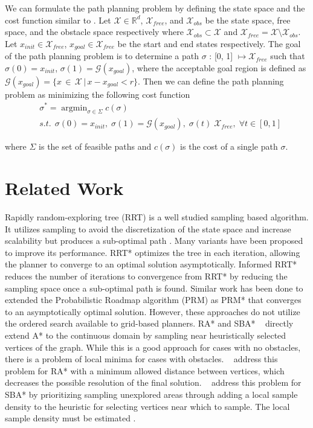 \documentclass{article}
\DeclareMathOperator*{\argmin}{argmin}
\begin{document}
We can formulate the path planning problem by defining the state space and the cost function similar to \cite{rrt*}. Let $\mathcal{X} \in \mathbb{R}^d$, $\mathcal{X}_{free}$, and $\mathcal{X}_{obs}$ be the state space, free space, and the obstacle space respectively where $\mathcal{X}_{obs} \subset \mathcal{X}$ and $\mathcal{X}_{free}  = \mathcal{X} \setminus \mathcal{X}_{obs}$. Let $x_{init} \in \mathcal{X}_{free}$, $x_{goal} \in \mathcal{X}_{free}$ be the start and end states respectively. The goal of the path planning problem is to determine a path $\sigma$ : [0, 1] $\mapsto \mathcal{X}_{free}$ such that $\sigma(0) = x_{init}$, $\sigma(1) = \mathcal{G}(x_{goal})$, where the acceptable goal region is defined as $\mathcal{G}(x_{goal}) = \{x \, \in \, \mathcal{X} \, | \, x - x_{goal} < r\}$. Then we can define the path planning problem as minimizing the following cost function
    \begin{align}
        & \sigma^* = \argmin_{\sigma \in \Sigma} c(\sigma) \\
        & s.t. \;\, \sigma(0) = x_{init}, \; \sigma(1) = \mathcal{G}(x_{goal}), \; \sigma(t) \;  \mathcal{X}_{free}, \; \forall t \in [0,1] \nonumber
    \end{align}
    
where $\Sigma$ is the set of feasible paths and $c(\sigma)$ is the cost of a single path $\sigma$.


\section{Related Work}
\label{sec:Related Work}
    Rapidly random-exploring tree (RRT) \cite{rrt} is a well studied sampling based algorithm. It utilizes sampling to avoid the discretization of the state space and increase scalability but produces a sub-optimal path \cite{rrt*}. Many variants have been proposed to improve its performance. RRT* \cite{rrt*} optimizes the tree in each iteration, allowing the planner to converge to an optimal solution asymptotically. Informed RRT* \cite{irrt} reduces the number of iterations to convergence from RRT* by reducing the sampling space once a sub-optimal path is found. Similar work has been done to extended the Probabilistic Roadmap algorithm (PRM) as PRM* \cite{rrt*} that converges to an asymptotically optimal solution. However, these approaches do not utilize the ordered search available to grid-based planners. RA* \citep{RA*} and SBA* ~\citep{SBA*} directly extend A* to the continuous domain by sampling near heuristically selected vertices of the graph. While this is a good approach for cases with no obstacles, there is a problem of local minima for cases with obstacles. ~\citet{RA*} address this problem for RA* with a minimum allowed distance between vertices, which decreases the possible resolution of the final solution. ~\citet{SBA*} address this problem for SBA* by prioritizing sampling unexplored areas through adding a local sample density to the heuristic for selecting vertices near which to sample. The local sample density must be estimated \cite{BIT*}.
    
\end{document}
